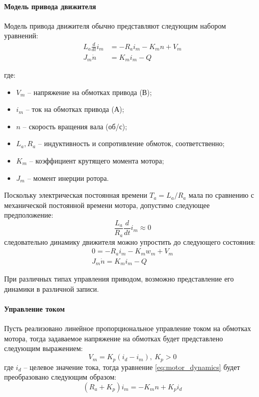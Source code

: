 \paragraph{Модель привода движителя}

Модель привода движителя обычно представляют следующим набором уравнений:
\begin{equation}
	\label{eq:motor_model}
	\begin{array}{ll}
	L_a\frac{d}{dt}i_m &=-R_ai_m-K_m n + V_m \\
    J_m\dot{n} &= K_m i_m - Q
	\end{array}
\end{equation}

\noindent где:
\begin{itemize}
    \item $V_m$ -- напряжение на обмотках привода (В);
    \item $i_m$ -- ток на обмотках привода (А);
    \item $n$ -- скорость вращения вала (об/с);
    \item $L_a, R_a$ -- индуктивность и сопротивление обмоток, соответственно;
    \item $K_m$ -- коэффициент крутящего момента мотора;
    \item $J_m$ -- момент инерции ротора.
\end{itemize}

Поскольку электрическая постоянная времени $T_a=L_a/R_a$ мала по сравнению с механической постоянной времени мотора, допустимо следующее предположение:
\begin{equation}
    \frac{L_a}{R_a}\frac{d}{dt}i_m \approx 0
\end{equation}
\noindent следовательно динамику движителя можно упростить до следующего состояния:
\begin{gather}
    \label{eq:motor_dynamics}
    0 = -R_a i_m-K_m w_m + V_m \\
    J_m\dot{n} = K_m i_m - Q
\end{gather}

При различных типах управления приводом, возможно представление его динамики в различной записи.

\paragraph{Управление током}
Пусть реализовано линейное пропорциональное управление током на обмотках мотора, тогда задаваемое напряжение на обмотках будет представлено следующим выражением:
\begin{equation}
    V_m = K_p(i_d - i_m),\: K_p>0
\end{equation}
\noindent где $i_d$ -- целевое значение тока, тогда уравнение \ref{eq:motor_dynamics} будет преобразовано следующим образом:
\begin{equation}
    (R_a + K_p)i_m = -K_mn + K_pi_d
\end{equation}

